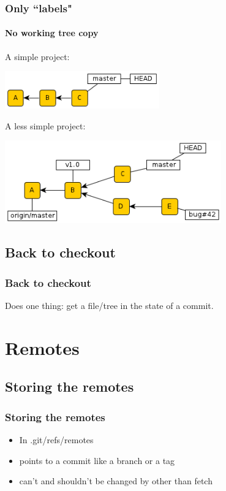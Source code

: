 \documentclass{beamer}
\begin{document}
    \begin{frame}
        \frametitle{Only ``labels"}
        \framesubtitle{No working tree copy}

        A simple project:

        \begin{center}
            \includegraphics[width=0.5\textwidth]{figures/branches1.png}
        \end{center}
        \pause
        A less simple project:
        \begin{center}
            \includegraphics[width=0.7\textwidth]{figures/branches2.png}
        \end{center}

    \end{frame}


    \subsection{Back to checkout}

    \begin{frame}
        \frametitle{Back to checkout}
        \begin{center}
            Does one thing: get a file/tree in the state of a commit.
        \end{center}
    \end{frame}

    \section{Remotes}

    \subsection{Storing the remotes}
    \begin{frame}
        \frametitle{Storing the remotes}

        \begin{itemize}
            \item In .git/refs/remotes
            \item points to a commit like a branch or a tag
            \item can't and shouldn't be changed by other than fetch
        \end{itemize}

    \end{frame}
\end{document}
